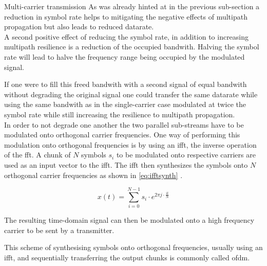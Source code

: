 \begin{subchapter}{Multi-carrier transmission}
  As was already hinted at in the previous sub-section a reduction
  in symbol rate helps to mitigating the negative effects of
  multipath propagation but also leads to reduced datarate. \\

  A second positive effect of reducing the symbol rate,
  in addition to increasing multipath resilience is
  a reduction of the occupied bandwith.
  Halving the symbol rate will lead to
  halve the frequency range being occupied by the
  modulated signal.

  If one were to fill this freed bandwith with a
  second signal of equal bandwith without
  degrading the original signal one could
  transfer the same datarate while using the
  same bandwith as in the single-carrier case
  modulated at twice the symbol rate
  while still increasing the resilience to
  multipath propagation. \\

  In order to not degrade one another the two parallel
  sub-streams have to be modulated onto orthogonal
  carrier frequencies.
  One way of performing this modulation onto orthogonal
  frequencies is by using an \gls{ifft}, the inverse operation
  of the \acrlong{fft}.
  A chunk of $N$ symbols $s_{i}$ to be modulated onto respective carriers
  are used as an input vector to the \gls{ifft}.
  The \gls{ifft} then synthesizes the symbols onto $N$ orthogonal
  carrier frequencies as shown in \autoref{eq:ifftsynth} \cite{kammeyer2012}.

  \begin{equation}
    \label{eq:ifftsynth}
    x(t) = \sum_{i=0}^{N-1} s_{i} \cdot e ^ {2\pi j \cdot \frac{it}{N}}
  \end{equation}

  The resulting time-domain signal can then be modulated onto
  a high frequency carrier to be sent by a transmitter.

  This scheme of synthesising symbols onto orthogonal
  frequencies, usually using an \gls{ifft}, and sequentially
  transferring the output chunks is commonly called \gls{ofdm}.
\end{subchapter}

